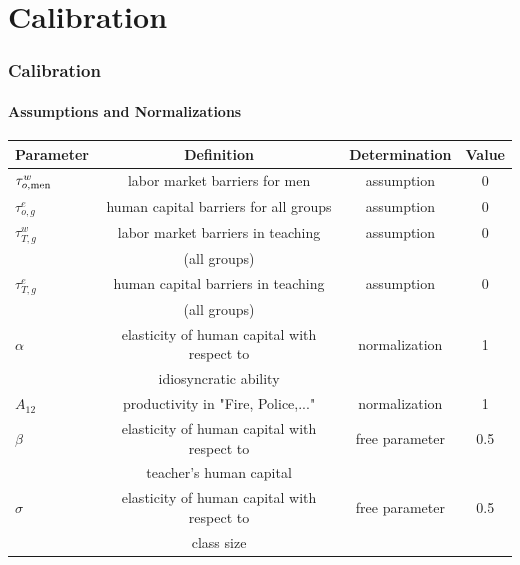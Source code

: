 \documentclass[11pt]{beamer}
\begin{document}
\section{Calibration}	
\begin{frame}
\frametitle{Calibration}
\framesubtitle{Assumptions and Normalizations}
  \tiny
	
	\begin{table}[h!]
		\centering
		\begin{tabular}{lccc}
			\toprule
			Parameter & Definition & Determination & Value\\
			\midrule
			$\tau^{w}_{o,{\rm men}}$ & labor market barriers for men & assumption & 0 \\
			$\tau^{e}_{o,g}$ & human capital barriers for all groups & assumption & 0 \\
			$\tau^{w}_{T,g}$ & labor market barriers in teaching  & assumption & 0 \\
			& (all groups)&\\
			$\tau^{e}_{T,g}$ & human capital barriers in teaching & assumption & 0 \\
			& (all groups) & \\
			$\alpha$ & elasticity of human capital with respect to & normalization & 1 \\
			& idiosyncratic ability & \\
            $A_{12}$ & productivity in "Fire, Police,..." & normalization & 1 \\
   \midrule
   			$\beta$ & elasticity of human capital with respect to & free parameter & 0.5\\
    & teacher's human capital & \\
            $\sigma$ & elasticity of human capital with respect to & free parameter & 0.5 \\
            & class size & \\
			\bottomrule
		\end{tabular}
		\label{tab:assump}
	\end{table}
\end{frame}
\end{document}
